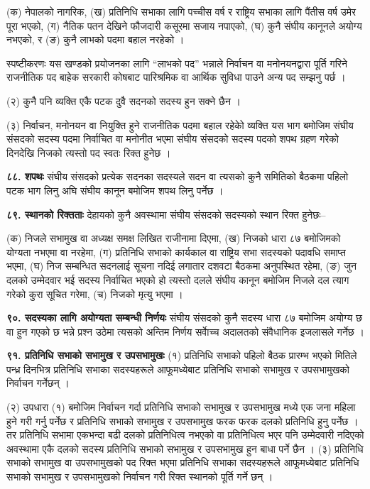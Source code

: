 (क) नेपालको नागरिक,
(ख) प्रतिनिधि सभाका लागि पच्चीस वर्ष र राष्ट्रिय सभाका लागि पैंतीस वर्ष उमेर पूरा भएको,
(ग) नैतिक पतन देखिने फौजदारी कसूरमा सजाय नपाएको,
(घ) कुनै संघीय कानूनले अयोग्य नभएको, र
(ङ) कुनै लाभको पदमा बहाल नरहेको ।

स्पष्टीकरणः यस खण्डको प्रयोजनका लागि “लाभको पद” भन्नाले निर्वाचन वा मनोनयनद्वारा पूर्ति गरिने राजनीतिक पद बाहेक सरकारी कोषबाट पारिश्रमिक वा आर्थिक सुविधा पाउने अन्य पद सम्झनु पर्छ ।

(२) कुनै पनि व्यक्ति एकै पटक दुवै सदनको सदस्य हुन सक्ने छैन ।

(३) निर्वाचन, मनोनयन वा नियुक्ति हुने राजनीतिक पदमा बहाल रहेकोे व्यक्ति यस भाग बमोजिम संघीय संसदको सदस्य पदमा निर्वाचित वा मनोनीत भएमा संघीय संसदको सदस्य पदको शपथ ग्रहण गरेको दिनदेखि निजको त्यस्तो पद स्वतः रिक्त हुनेछ ।

\textbf{८८. शपथः} संघीय संसदको प्रत्येक सदनका सदस्यले सदन वा त्यसको कुनै समितिको बैठकमा पहिलो पटक भाग लिनु अघि संघीय कानून बमोजिम शपथ लिनु पर्नेछ ।

\textbf{८९. स्थानको रिक्तताः} देहायको कुनै अवस्थामा संघीय संसदको सदस्यको स्थान रिक्त हुनेछः–

(क) निजले सभामुख वा अध्यक्ष समक्ष लिखित राजीनामा दिएमा,
(ख) निजको धारा ८७ बमोजिमको योग्यता नभएमा वा नरहेमा,
(ग) प्रतिनिधि सभाको कार्यकाल वा राष्ट्रिय सभा सदस्यको पदावधि समाप्त भएमा,
(घ) निज सम्बन्धित सदनलाई सूचना नदिई लगातार दशवटा बैठकमा अनुपस्थित रहेमा,
(ङ) जुन दलको उम्मेदवार भई सदस्य निर्वाचित भएको हो त्यस्तो दलले संघीय कानून बमोजिम निजले दल त्याग गरेको कुरा सूचित गरेमा,
(च) निजको मृत्यु भएमा ।

\textbf{९०. सदस्यका लागि अयोग्यता सम्बन्धी निर्णयः} संघीय संसदको कुनै सदस्य धारा ८७ बमोजिम अयोग्य छ वा हुन गएको छ भन्ने प्रश्न उठेमा त्यसको अन्तिम निर्णय सर्वाेच्च अदालतको संवैधानिक इजलासले गर्नेछ ।

\textbf{९१. प्रतिनिधि सभाको सभामुख र उपसभामुखः} (१) प्रतिनिधि सभाको पहिलो बैठक प्रारम्भ भएको मितिले पन्ध्र दिनभित्र प्रतिनिधि सभाका सदस्यहरूले आफूमध्येबाट प्रतिनिधि सभाको सभामुख र उपसभामुखको निर्वाचन गर्नेछन् ।

(२) उपधारा (१) बमोजिम निर्वाचन गर्दा प्रतिनिधि सभाको सभामुख र उपसभामुख मध्ये एक जना महिला हुने गरी गर्नु पर्नेछ र प्रतिनिधि सभाको सभामुख र उपसभामुख फरक फरक दलको प्रतिनिधि हुनु पर्नेछ । तर प्रतिनिधि सभामा एकभन्दा बढी दलको प्रतिनिधित्व नभएको वा प्रतिनिधित्व भएर पनि उम्मेदवारी नदिएको अवस्थामा एकै दलको सदस्य प्रतिनिधि सभाको सभामुख र उपसभामुख हुन बाधा पर्ने छैन ।
(३) प्रतिनिधि सभाको सभामुख वा उपसभामुखको पद रिक्त भएमा प्रतिनिधि सभाका सदस्यहरूले आफूमध्येबाट प्रतिनिधि सभाको सभामुख र उपसभामुखको निर्वाचन गरी रिक्त स्थानको पूर्ति गर्ने छन् ।

